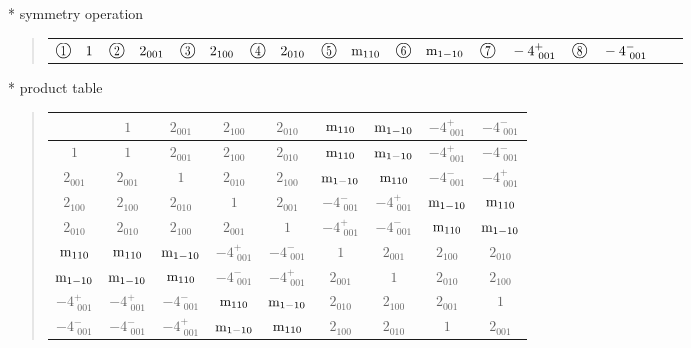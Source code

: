\documentclass[fleqn,10pt,landscape]{jsarticle}
\begin{document}
* symmetry operation
\begin{quote}
\begin{tabular}{llllllllll}
$ {\ooalign{\hfil\resizebox{.8\width}{\height}{1}\hfil\crcr\raise.1ex\hbox{\large$\bigcirc$}}}\quad 1 $ & $ {\ooalign{\hfil\resizebox{.8\width}{\height}{2}\hfil\crcr\raise.1ex\hbox{\large$\bigcirc$}}}\quad 2{}_{001} $ & $ {\ooalign{\hfil\resizebox{.8\width}{\height}{3}\hfil\crcr\raise.1ex\hbox{\large$\bigcirc$}}}\quad 2{}_{100} $ & $ {\ooalign{\hfil\resizebox{.8\width}{\height}{4}\hfil\crcr\raise.1ex\hbox{\large$\bigcirc$}}}\quad 2{}_{010} $ & $ {\ooalign{\hfil\resizebox{.8\width}{\height}{5}\hfil\crcr\raise.1ex\hbox{\large$\bigcirc$}}}\quad {\rm m}_{110} $ & $ {\ooalign{\hfil\resizebox{.8\width}{\height}{6}\hfil\crcr\raise.1ex\hbox{\large$\bigcirc$}}}\quad {\rm m}_{1-10} $ & $ {\ooalign{\hfil\resizebox{.8\width}{\height}{7}\hfil\crcr\raise.1ex\hbox{\large$\bigcirc$}}}\quad -4^{+}_{\,\,001} $ & $ {\ooalign{\hfil\resizebox{.8\width}{\height}{8}\hfil\crcr\raise.1ex\hbox{\large$\bigcirc$}}}\quad -4^{-}_{\,\,001} $
\end{tabular}
\end{quote}

* product table
\begin{quote}
\begin{tabular}{ccccccccc} \hline \hline
 & $ 1 $ & $ 2{}_{001} $ & $ 2{}_{100} $ & $ 2{}_{010} $ & $ {\rm m}_{110} $ & $ {\rm m}_{1-10} $ & $ -4^{+}_{\,\,001} $ & $ -4^{-}_{\,\,001} $ \\ \hline
$ 1 $ & $ 1 $ & $ 2{}_{001} $ & $ 2{}_{100} $ & $ 2{}_{010} $ & $ {\rm m}_{110} $ & $ {\rm m}_{1-10} $ & $ -4^{+}_{\,\,001} $ & $ -4^{-}_{\,\,001} $ \\
$ 2{}_{001} $ & $ 2{}_{001} $ & $ 1 $ & $ 2{}_{010} $ & $ 2{}_{100} $ & $ {\rm m}_{1-10} $ & $ {\rm m}_{110} $ & $ -4^{-}_{\,\,001} $ & $ -4^{+}_{\,\,001} $ \\
$ 2{}_{100} $ & $ 2{}_{100} $ & $ 2{}_{010} $ & $ 1 $ & $ 2{}_{001} $ & $ -4^{-}_{\,\,001} $ & $ -4^{+}_{\,\,001} $ & $ {\rm m}_{1-10} $ & $ {\rm m}_{110} $ \\
$ 2{}_{010} $ & $ 2{}_{010} $ & $ 2{}_{100} $ & $ 2{}_{001} $ & $ 1 $ & $ -4^{+}_{\,\,001} $ & $ -4^{-}_{\,\,001} $ & $ {\rm m}_{110} $ & $ {\rm m}_{1-10} $ \\
$ {\rm m}_{110} $ & $ {\rm m}_{110} $ & $ {\rm m}_{1-10} $ & $ -4^{+}_{\,\,001} $ & $ -4^{-}_{\,\,001} $ & $ 1 $ & $ 2{}_{001} $ & $ 2{}_{100} $ & $ 2{}_{010} $ \\
$ {\rm m}_{1-10} $ & $ {\rm m}_{1-10} $ & $ {\rm m}_{110} $ & $ -4^{-}_{\,\,001} $ & $ -4^{+}_{\,\,001} $ & $ 2{}_{001} $ & $ 1 $ & $ 2{}_{010} $ & $ 2{}_{100} $ \\
$ -4^{+}_{\,\,001} $ & $ -4^{+}_{\,\,001} $ & $ -4^{-}_{\,\,001} $ & $ {\rm m}_{110} $ & $ {\rm m}_{1-10} $ & $ 2{}_{010} $ & $ 2{}_{100} $ & $ 2{}_{001} $ & $ 1 $ \\
$ -4^{-}_{\,\,001} $ & $ -4^{-}_{\,\,001} $ & $ -4^{+}_{\,\,001} $ & $ {\rm m}_{1-10} $ & $ {\rm m}_{110} $ & $ 2{}_{100} $ & $ 2{}_{010} $ & $ 1 $ & $ 2{}_{001} $ \\
 \hline \hline
\end{tabular}
\end{quote}
\end{document}
